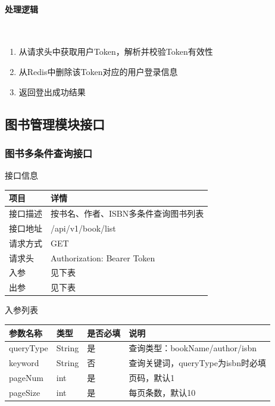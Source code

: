 \documentclass[12pt, a4paper]{article}
\begin{document}
\paragraph{处理逻辑}
\mbox{}\\
\begin{enumerate}
    \item 从请求头中获取用户Token，解析并校验Token有效性
    \item 从Redis中删除该Token对应的用户登录信息
    \item 返回登出成功结果
\end{enumerate}


\subsection{图书管理模块接口}

\subsubsection{图书多条件查询接口}

\begin{center}
    接口信息
\end{center}

\begin{table}[H]
    \centering
    \begin{tabular}{|l|l|}
        \hline
        项目 & 详情 \\
        \hline
        接口描述 & 按书名、作者、ISBN多条件查询图书列表 \\
        \hline
        接口地址 & /api/v1/book/list \\
        \hline
        请求方式 & GET \\
        \hline
        请求头 & Authorization: Bearer {Token} \\
        \hline
        入参 & 见下表 \\
        \hline
        出参 & 见下表 \\
        \hline
    \end{tabular}
\end{table}

入参列表

\begin{table}[H]
    \centering
    \begin{tabular}{|l|l|l|l|}
        \hline
        参数名称 & 类型 & 是否必填 & 说明 \\
        \hline
        queryType & String & 是 & 查询类型：bookName/author/isbn \\
        \hline
        keyword & String & 否 & 查询关键词，queryType为isbn时必填 \\
        \hline
        pageNum & int & 是 & 页码，默认1 \\
        \hline
        pageSize & int & 是 & 每页条数，默认10 \\
        \hline
    \end{tabular}
\end{table}
\end{document}
